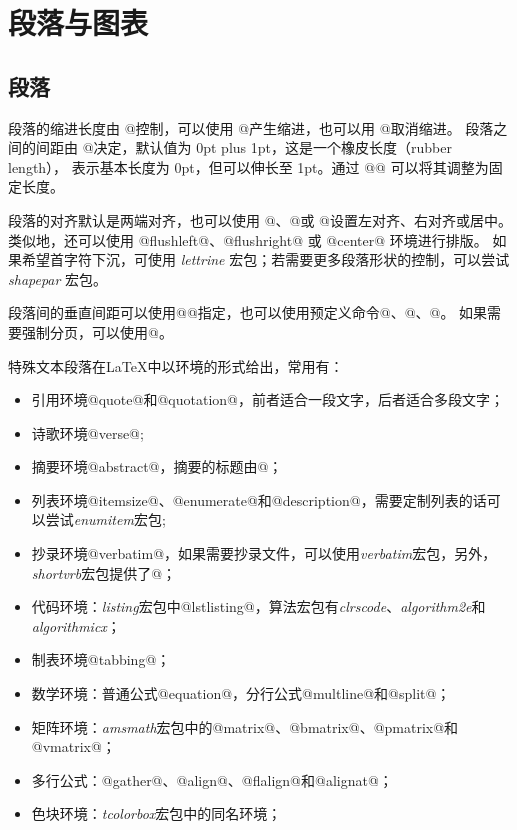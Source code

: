 \section{段落与图表}
\subsection{段落}
段落的缩进长度由 @ 控制，可以使用 @\indent@ 产生缩进，也可以用 @\noindent@ 取消缩进。
段落之间的间距由 @ 决定，默认值为 0pt plus 1pt，这是一个橡皮长度（rubber length），
表示基本长度为 0pt，但可以伸长至 1pt。通过 @\setlength{\parskip}{0pt}@ 可以将其调整为固定长度。

段落的对齐默认是两端对齐，也可以使用 @\raggedright@、@\raggedleft@ 或 @\centering@ 设置左对齐、右对齐或居中。
类似地，还可以使用 @flushleft@、@flushright@ 或 @center@ 环境进行排版。
如果希望首字符下沉，可使用 \emph{lettrine} 宏包；若需要更多段落形状的控制，可以尝试 \emph{shapepar} 宏包。

段落间的垂直间距可以使用@\vspace{}@指定，也可以使用预定义命令@\smallskip@、@\midskip@、@\bigskip@。
如果需要强制分页，可以使用@。

特殊文本段落在\LaTeX 中以环境的形式给出，常用有：
\begin{itemize}[itemsep=0pt, parsep=0pt]
	\item 引用环境@quote@和@quotation@，前者适合一段文字，后者适合多段文字；
	\item 诗歌环境@verse@;
	\item 摘要环境@abstract@，摘要的标题由@；
	\item 列表环境@itemsize@、@enumerate@和@description@，需要定制列表的话可以尝试\emph{enumitem}宏包;
	\item 抄录环境@verbatim@，如果需要抄录文件，可以使用\emph{verbatim}宏包，另外，\emph{shortvrb}宏包提供了@；
	\item 代码环境：\emph{listing}宏包中@lstlisting@，算法宏包有\emph{clrscode}、\emph{algorithm2e}和\emph{algorithmicx}；
	\item 制表环境@tabbing@；
	\item 数学环境：普通公式@equation@，分行公式@multline@和@split@；
	\item 矩阵环境：\emph{amsmath}宏包中的@matrix@、@bmatrix@、@pmatrix@和@vmatrix@；
	\item 多行公式：@gather@、@align@、@flalign@和@alignat@；
	\item 色块环境：\emph{tcolorbox}宏包中的同名环境；
\end{itemize}

